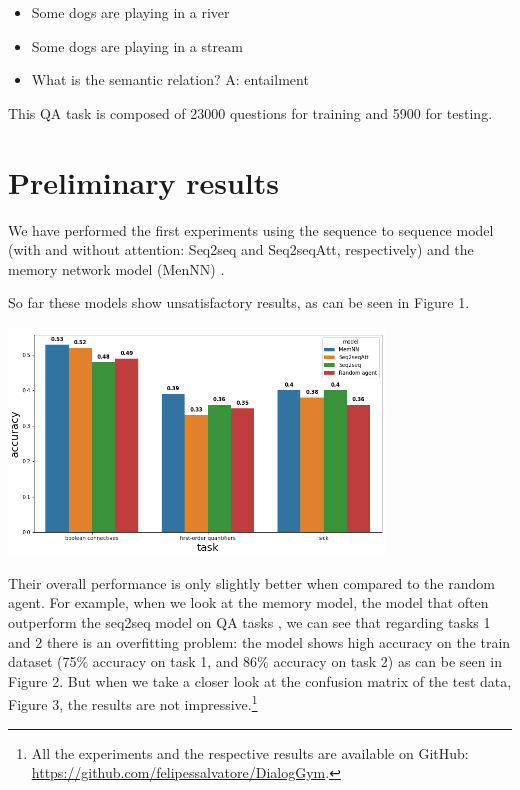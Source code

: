 \begin{itemize} 
\item[] Some dogs are playing in a river
\item[] Some dogs are playing in a stream
\item[] What is the semantic relation? A: entailment
\end{itemize}

This QA task is composed of 23000 questions for training and 5900 for testing.

\section{Preliminary results}
\label{ch:03-preliminary-results}

We have performed the first experiments using the sequence to sequence model \cite{Sustskever}(with and without attention: Seq2seq and Seq2seqAtt, respectively) and the memory network model (MenNN) \cite{WestonCB14}.

So far these models show unsatisfactory results, as can be seen in Figure 1.

\begin{center}
\includegraphics[width=10.0cm]{img/comparative_results.png}
\end{center}

Their overall performance is only slightly better when compared to the random agent. For example, when we look at the memory model, the model that often  outperform the seq2seq model on QA tasks \cite{WestonBCM15}, we can see that regarding tasks 1 and 2 there is an overfitting problem: the model shows high accuracy on the train dataset (75$\%$ accuracy on task 1, and 86$\%$ accuracy on task 2) as can be seen in Figure 2. But when we take a closer look at the confusion matrix of the test data, Figure 3, the results are not impressive.\footnote{All the experiments and the respective results are available on GitHub: \url{https://github.com/felipessalvatore/DialogGym}.}
  


